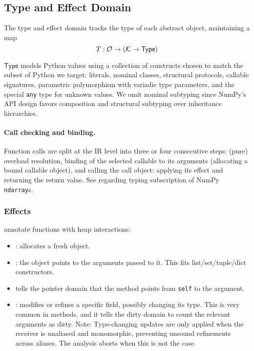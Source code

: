\subsection{Type and Effect Domain}
\label{sec:type}

The type and effect domain tracks the type of each abstract object, maintaining a map \[T : \mathcal{O} \to (\mathcal{K} \to \mathsf{Type})\] 

$\mathsf{Type}$ models Python values using a collection of constructs chosen to match the subset of Python we target: literals, nominal classes, structural protocols, callable signatures, parametric polymorphism with variadic type parameters, and the special \texttt{any} type for unknown values. We omit nominal subtyping since NumPy's API design favors composition and structural subtyping over inheritance hierarchies.

\paragraph{Call checking and binding.}
Function calls are split at the IR level into three or four consecutive steps: (pure) overload resolution, binding of the selected callable to its arguments (allocating a bound callable object), and calling the call object: applying its effect and returning the return value. See  regarding typing subscription of NumPy \texttt{ndarray}s.

\subsubsection{Effects} annotate functions with heap interactions:
\begin{itemize}
  \item \tnew: allocates a fresh object.
  \item \tptstoargs: the \tnew object points to the arguments passed to it. This fits list/set/tuple/dict constructors.
  \item \tboundmeth tells the pointer domain that the method points from \texttt{self} to the argument.
  \item \tupdate: modifies or refines a specific field, possibly changing its type. This is very common in methods, and it tells the dirty domain to count the relevant arguments as dirty. Note: Type-changing updates are only applied when the receiver is unaliased and monomorphic, preventing unsound refinements across aliases. The analysis aborts when this is not the case.
\end{itemize}

